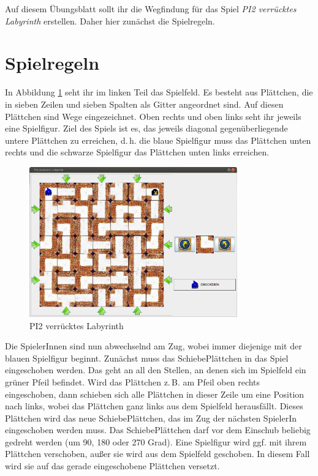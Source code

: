 \documentclass{pi-aufgabenblatt}
\newcommand{\zB}{\mbox{z.\,B.}\xspace}
\newcommand{\gGF}{\mbox{ggf.}\xspace}
\newcommand{\dH}{\mbox{d.\,h.}\xspace}
\begin{document}

Auf diesem Übungsblatt sollt ihr die Wegfindung für das Spiel \textit{PI2 verrücktes Labyrinth} erstellen. Daher 
hier zunächst die Spielregeln.

\section*{Spielregeln}
In Abbildung \ref{gui} seht ihr im linken Teil das Spielfeld. Es besteht aus Plättchen, die in sieben Zeilen und 
sieben Spalten als Gitter angeordnet sind. Auf diesen Plättchen sind Wege eingezeichnet. Oben rechts und oben links seht 
ihr
jeweils eine Spielfigur. Ziel des Spiels ist es, das jeweils diagonal gegenüberliegende untere Plättchen zu erreichen, 
\dH die blaue Spielfigur muss das Plättchen unten rechts und die schwarze Spielfigur das Plättchen unten links 
erreichen. 

\begin{figure}[h]
  \centering
  \includegraphics[width=0.8\textwidth]{hauptfenster.png}
  \caption{PI2 verrücktes Labyrinth}
  \label{gui}
\end{figure}

Die SpielerInnen sind nun abwechselnd am Zug, wobei immer diejenige mit der blauen Spielfigur beginnt. 
Zunächst muss das SchiebePlättchen in das Spiel eingeschoben werden. Das geht an all den Stellen, an denen sich im 
Spielfeld ein grüner Pfeil befindet. Wird das Plättchen \zB am Pfeil oben rechts eingeschoben, dann schieben sich 
alle Plättchen in dieser Zeile um eine Position nach links, wobei das Plättchen ganz links aus dem Spielfeld 
herausfällt. Dieses Plättchen wird das neue SchiebePlättchen, das im Zug der nächsten SpielerIn eingeschoben werden 
muss. Das SchiebePlättchen darf vor dem Einschub beliebig gedreht werden (um 90, 180 oder 270 Grad). Eine Spielfigur 
wird \gGF mit ihrem Plättchen verschoben, außer sie wird aus dem Spielfeld geschoben. In diesem Fall wird sie auf das 
gerade eingeschobene Plättchen versetzt.
\end{document}
